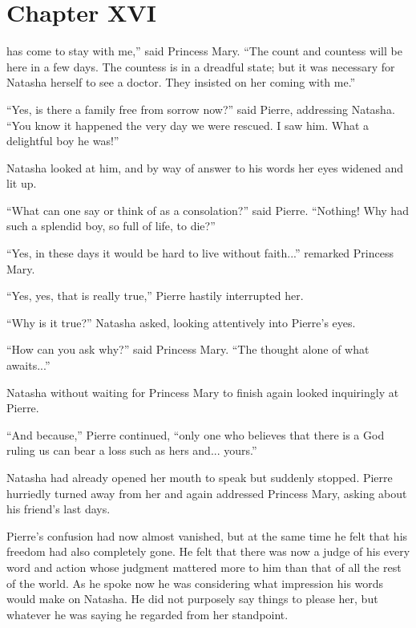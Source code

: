 \chapter*{Chapter XVI}
\ifaudio 
{}
\fi

 has come to stay with me,'' said Princess Mary. ``The count
and countess will be here in a few days. The countess is in a
dreadful state; but it was necessary for Natasha herself to see a
doctor. They insisted on her coming with me.''

``Yes, is there a family free from sorrow now?'' said Pierre,
addressing Natasha. ``You know it happened the very day we were
rescued. I saw him.  What a delightful boy he was!''

Natasha looked at him, and by way of answer to his words her eyes
widened and lit up.

``What can one say or think of as a consolation?'' said
Pierre. ``Nothing!  Why had such a splendid boy, so full of life,
to die?''

``Yes, in these days it would be hard to live without faith...''
remarked Princess Mary.

``Yes, yes, that is really true,'' Pierre hastily interrupted
her.

``Why is it true?'' Natasha asked, looking attentively into
Pierre's eyes.

``How can you ask why?'' said Princess Mary. ``The thought alone
of what awaits...''

Natasha without waiting for Princess Mary to finish again looked
inquiringly at Pierre.

``And because,'' Pierre continued, ``only one who believes that
there is a God ruling us can bear a loss such as hers
and... yours.''

Natasha had already opened her mouth to speak but suddenly
stopped.  Pierre hurriedly turned away from her and again
addressed Princess Mary, asking about his friend's last days.

Pierre's confusion had now almost vanished, but at the same time
he felt that his freedom had also completely gone. He felt that
there was now a judge of his every word and action whose judgment
mattered more to him than that of all the rest of the world. As
he spoke now he was considering what impression his words would
make on Natasha. He did not purposely say things to please her,
but whatever he was saying he regarded from her standpoint.

